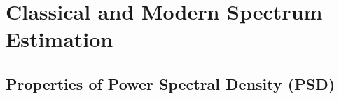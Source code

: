 \documentclass[12pt]{article}
\date{April 2019}
\numberwithin{equation}{section}
\begin{document}
	



\newpage
\setcounter{tocdepth}{2} %
\tableofcontents
\newpage
\section{Classical and Modern Spectrum Estimation} \label{sec: 1-CMSE}
	\subsection{Properties of Power Spectral Density (PSD)} \label{sec: 1-1-prop-PSD}
	
\end{document}
